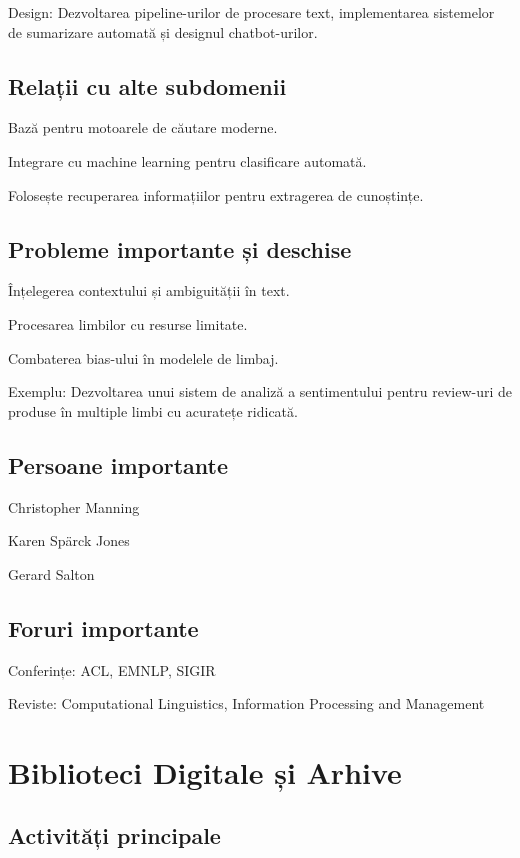 \documentclass[12pt]{article}
\begin{document}
Design: Dezvoltarea pipeline-urilor de procesare text, implementarea sistemelor de sumarizare automată și designul chatbot-urilor.

\subsection*{Relații cu alte subdomenii}

Bază pentru motoarele de căutare moderne.

Integrare cu machine learning pentru clasificare automată.

Folosește recuperarea informațiilor pentru extragerea de cunoștințe.

\subsection*{Probleme importante și deschise}

Înțelegerea contextului și ambiguității în text.

Procesarea limbilor cu resurse limitate.

Combaterea bias-ului în modelele de limbaj.

Exemplu: Dezvoltarea unui sistem de analiză a sentimentului pentru review-uri de produse în multiple limbi cu acuratețe ridicată.

\subsection*{Persoane importante}

Christopher Manning

Karen Spärck Jones

Gerard Salton

\subsection*{Foruri importante}

Conferințe: ACL, EMNLP, SIGIR

Reviste: Computational Linguistics, Information Processing and Management

\section{Biblioteci Digitale și Arhive}

\subsection*{Activități principale}
\end{document}
